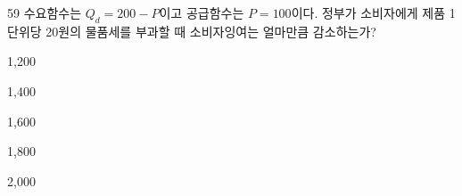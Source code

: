 \begin{question}{59}
수요함수는 $Q_{ d } =200-P$이고 공급함수는 $P=100$이다. 정부가 소비자에게 제품 1단위당 20원의 물품세를 부과할 때 소비자잉여는 얼마만큼 감소하는가?
\begin{choices}
  \item 1,200
  \item 1,400
  \item 1,600
  \item 1,800
  \item 2,000
\end{choices}
\end{question}
